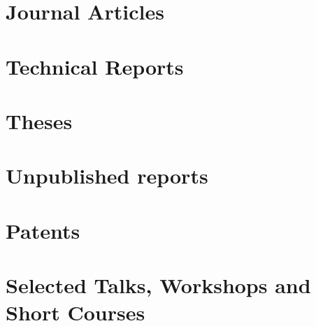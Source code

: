 \documentclass[11pt]{article}
\newcommand{\recent}[2]{
\defbibcheck{checkrecent}{
  \iffieldint{year}
             {\ifnumless{\thefield{year}}{#1}
               {\skipentry}
               {\ifnumgreater{\thefield{year}}{#2}
                 {\skipentry} {}}} {\skipentry}}}
\begin{document}
\section{Journal Articles}
\begin{refsection}[journal]
  \nocite{*}
  \printbibliography[keyword={journal-article}, title={}
  ]
\end{refsection}

\section{Technical Reports}
\begin{refsection}[tr]
  \nocite{*}
  \printbibliography[keyword={tech-report}, title={}
  ]  
\end{refsection}
\section{Theses}
\begin{refsection}[thesis]
  \nocite{*}
  \printbibliography[keyword={thesis}, title={Theses}]  
\end{refsection}


\section{Unpublished reports}
\begin{refsection}[unpublished]
  \nocite{*}
  \printbibliography[keyword={unpublished}, title={}
  ]  
\end{refsection}

\section{Patents}
\begin{refsection}[patents]
  \nocite{*}
  \printbibliography[keyword={patent}, title={}
  ]  
\end{refsection}

\section{Selected Talks, Workshops and Short Courses}
\begin{refsection}[talks]
\nocite{*}
\printbibliography[keyword={talk}, title={}
]
\end{refsection}



\end{document}
